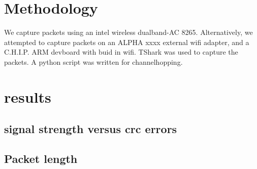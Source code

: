 \documentclass{article}
\begin{document}
\section{Methodology}

We capture packets using an intel wireless dualband-AC 8265. Alternatively, we attempted to capture packets on an ALPHA xxxx external wifi adapter, and a C.H.I.P. ARM devboard with buid in wifi.
TShark was used to capture the packets. A python script was written for channelhopping.


\section{results}

\subsection{signal strength versus crc errors}

\begin{figure}
		\caption{}
		\label{fig:totalpackets}
\end{figure}

\begin{figure}
		\caption{}
		\label{fig:24packets}
\end{figure}

\begin{figure}
		\caption{}
		\label{fig:58packets}
\end{figure}

\subsection{Packet length}


\printbibliography
\end{document}
